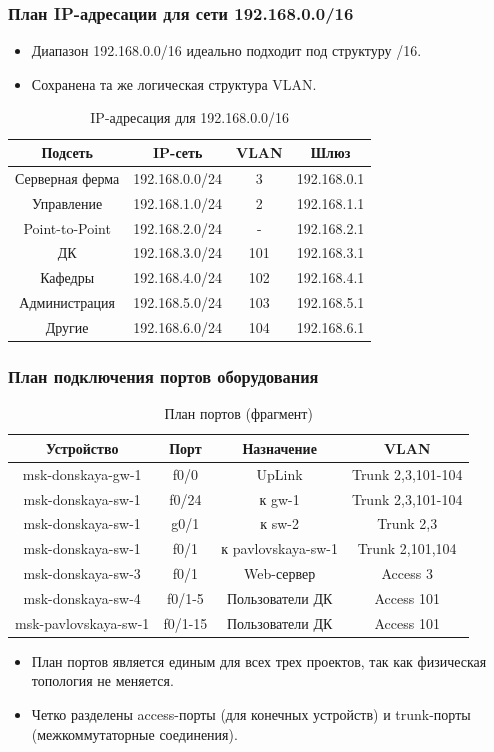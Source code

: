 \begin{frame}
\frametitle{План IP-адресации для сети 192.168.0.0/16}
\begin{itemize}
    \item Диапазон 192.168.0.0/16 идеально подходит под структуру /16.
    \item Сохранена та же логическая структура VLAN.
\end{itemize}
\begin{table}[h]
\centering
\caption{IP-адресация для 192.168.0.0/16}
\begin{tabular}{|c|c|c|c|}
\hline
\textbf{Подсеть} & \textbf{IP-сеть} & \textbf{VLAN} & \textbf{Шлюз} \\
\hline
Серверная ферма & 192.168.0.0/24 & 3 & 192.168.0.1 \\
Управление & 192.168.1.0/24 & 2 & 192.168.1.1 \\
Point-to-Point & 192.168.2.0/24 & - & 192.168.2.1 \\
ДК & 192.168.3.0/24 & 101 & 192.168.3.1 \\
Кафедры & 192.168.4.0/24 & 102 & 192.168.4.1 \\
Администрация & 192.168.5.0/24 & 103 & 192.168.5.1 \\
Другие & 192.168.6.0/24 & 104 & 192.168.6.1 \\
\hline
\end{tabular}
\end{table}
\end{frame}

\begin{frame}
\frametitle{План подключения портов оборудования}
\begin{table}[h]
\centering
\caption{План портов (фрагмент)}
\begin{tabular}{|c|c|c|c|}
\hline
\textbf{Устройство} & \textbf{Порт} & \textbf{Назначение} & \textbf{VLAN} \\
\hline
msk-donskaya-gw-1 & f0/0 & UpLink & Trunk 2,3,101-104 \\
msk-donskaya-sw-1 & f0/24 & к gw-1 & Trunk 2,3,101-104 \\
msk-donskaya-sw-1 & g0/1 & к sw-2 & Trunk 2,3 \\
msk-donskaya-sw-1 & f0/1 & к pavlovskaya-sw-1 & Trunk 2,101,104 \\
msk-donskaya-sw-3 & f0/1 & Web-сервер & Access 3 \\
msk-donskaya-sw-4 & f0/1-5 & Пользователи ДК & Access 101 \\
msk-pavlovskaya-sw-1 & f0/1-15 & Пользователи ДК & Access 101 \\
\hline
\end{tabular}
\end{table}
\begin{itemize}
    \item План портов является единым для всех трех проектов, так как физическая топология не меняется.
    \item Четко разделены access-порты (для конечных устройств) и trunk-порты (межкоммутаторные соединения).
\end{itemize}
\end{frame}

